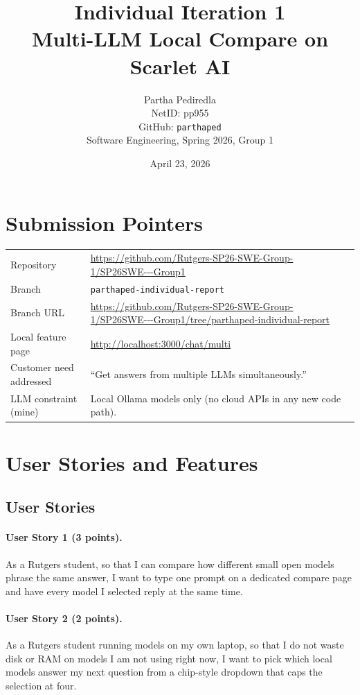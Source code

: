\documentclass[11pt]{article}
\title{Individual Iteration 1\\ \large Multi-LLM Local Compare on Scarlet AI}
\author{Partha Pediredla \\ NetID: pp955 \\ GitHub: \texttt{parthaped} \\ Software Engineering, Spring 2026, Group 1}
\date{April 23, 2026}
\begin{document}
\maketitle

\section*{Submission Pointers}

\begin{tabularx}{\textwidth}{lX}
\toprule
Repository & \url{https://github.com/Rutgers-SP26-SWE-Group-1/SP26SWE---Group1} \\
Branch & \texttt{parthaped-individual-report} \\
Branch URL & \url{https://github.com/Rutgers-SP26-SWE-Group-1/SP26SWE---Group1/tree/parthaped-individual-report} \\
Local feature page & \url{http://localhost:3000/chat/multi} \\
Customer need addressed & ``Get answers from multiple LLMs simultaneously.'' \\
LLM constraint (mine) & Local Ollama models only (no cloud APIs in any new code path). \\
\bottomrule
\end{tabularx}

\section{User Stories and Features}

\subsection{User Stories}

\paragraph{User Story 1 (3 points).}
As a Rutgers student, so that I can compare how different small open models
phrase the same answer, I want to type one prompt on a dedicated compare page
and have every model I selected reply at the same time.

\paragraph{User Story 2 (2 points).}
As a Rutgers student running models on my own laptop, so that I do not waste
disk or RAM on models I am not using right now, I want to pick which local
models answer my next question from a chip-style dropdown that caps the
selection at four.
\end{document}
